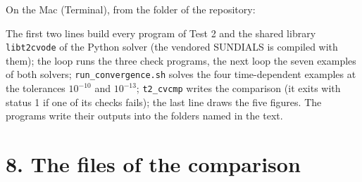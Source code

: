 \documentclass[
  10pt,
]{article}
\newenvironment{Shaded}{}{}
\newcommand{\AttributeTok}[1]{\textcolor[rgb]{0.49,0.56,0.16}{#1}}
\newcommand{\BuiltInTok}[1]{\textcolor[rgb]{0.00,0.50,0.00}{#1}}
\newcommand{\ControlFlowTok}[1]{\textcolor[rgb]{0.00,0.44,0.13}{\textbf{#1}}}
\newcommand{\ExtensionTok}[1]{#1}
\newcommand{\FunctionTok}[1]{\textcolor[rgb]{0.02,0.16,0.49}{#1}}
\newcommand{\KeywordTok}[1]{\textcolor[rgb]{0.00,0.44,0.13}{\textbf{#1}}}
\newcommand{\NormalTok}[1]{#1}
\newcommand{\StringTok}[1]{\textcolor[rgb]{0.25,0.44,0.63}{#1}}
\newcommand{\VariableTok}[1]{\textcolor[rgb]{0.10,0.09,0.49}{#1}}
\begin{document}
On the Mac (Terminal), from the folder of the repository:

\begin{Shaded}
\end{Shaded}

The first two lines build every program of Test 2 and the shared library
\texttt{libt2cvode} of the Python solver (the vendored SUNDIALS is
compiled with them); the loop runs the three check programs, the next
loop the seven examples of both solvers; \texttt{run\_convergence.sh}
solves the four time-dependent examples at the tolerances \(10^{-10}\)
and \(10^{-13}\); \texttt{t2\_cvcmp} writes the comparison (it exits
with status 1 if one of its checks fails); the last line draws the five
figures. The programs write their outputs into the folders named in the
text.

\hypertarget{the-files-of-the-comparison}{%
\section{8. The files of the
comparison}\label{the-files-of-the-comparison}}
\end{document}
